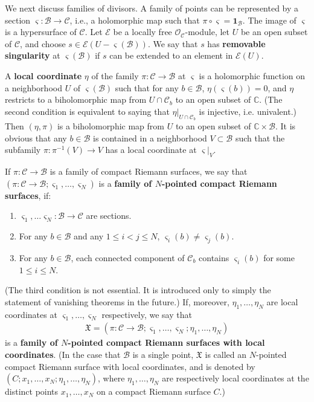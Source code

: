 \documentclass[12pt,a4paper,notitlepage]{report}
\theoremstyle{definition}
\theoremstyle{plain}
\newcommand{\fk}{\mathfrak}
\newcommand{\mc}{\mathcal}
\newcommand{\wtd}{\widetilde}
\newcommand{\id}{\mathbf{1}}
\newcommand{\scr}{\mathscr}
\newcommand{\sgm}{\varsigma}
\numberwithin{equation}{section}
\begin{document}
We next discuss families of divisors. A family of points can be represented by a  section $\sgm:\mc B\rightarrow\mc C$, i.e., a holomorphic map such that $\pi\circ \sgm=\id_{\mc B}$. The image of $\sgm$ is a hypersurface of $\mc C$. Let $\scr E$ be a locally free $\scr O_{\mc C}$-module, let $U$ be  an open subset of $\mc C$, and choose  $s\in\scr E(U-\sgm(\mc B))$. We say that $s$ has \textbf{removable singularity} at $\sgm(\mc B)$ if $s$ can be extended to an element in $\scr E(U)$. 

A \textbf{local coordinate} $\eta$ of the family $\pi:\mc C\rightarrow\mc B$ at $\sgm$ is a holomorphic function on a neighborhood $U$ of $\sgm(\mc B)$  such that for any $b\in \mc B$,  $\eta(\sgm(b))=0$, and  $\eta$  restricts to a biholomorphic map from $U\cap\mc C_b$ to an open subset of $\mathbb C$. (The second condition is equivalent to saying that $\eta|_{U\cap\mc C_b}$ is injective, i.e. univalent.)  Then $(\eta,\pi)$ is a biholomorphic map from $U$ to an open subset of $\mathbb C\times\mc B$. It is obvious that  any $b\in\mc B$ is contained in a neighborhood $V\subset\mc B$ such that the subfamily $\pi:\pi^{-1}(V)\rightarrow V$ has a local coordinate at $\sgm|_V$.

If $\pi:\mc C\rightarrow\mc B$ is a family of compact Riemann surfaces, we say that $(\pi:\mc C\rightarrow\mc B;\sgm_1,\dots,\sgm_N)$ is a \textbf{family of $N$-pointed compact Riemann surfaces}, if: 
\begin{enumerate}[label=(\alph*)]
\item $\sgm_1,\dots\sgm_N:\mc B\rightarrow\mc C$ are sections.
\item For any $b\in\mc B$ and any $1\leq i<j\leq N$, $\sgm_i(b)\neq\sgm_j(b)$.
\item For any $b\in\mc B$, each connected component of $\mc C_b$ contains $\sgm_i(b)$ for some $1\leq i\leq N$.
\end{enumerate}
(The third condition is not essential. It is introduced only to simply the statement  of vanishing theorems in the future.) If, moreover, $\eta_1,\dots,\eta_N$ are local coordinates at $\sgm_1,\dots,\sgm_N$ respectively, we say that
\begin{align*}
\fk X=(\pi:\mc C\rightarrow\mc B;\sgm_1,\dots,\sgm_N;\eta_1,\dots,\eta_N)
\end{align*}
is a \textbf{family of $N$-pointed compact Riemann surfaces with local coordinates}. \index{XX@$\wtd {\fk X}$ and $\fk X$} (In the case that $\mc B$ is a single point, $\fk X$ is called an $N$-pointed compact Riemann surface with local coordinates, and is denoted by $(C;x_1,\dots,x_N;\eta_1,\dots,\eta_N)$, where $\eta_1,\dots,\eta_N$ are respectively local coordinates at the distinct points $x_1,\dots,x_N$ on a compact Riemann surface $C$.)
\end{document}
